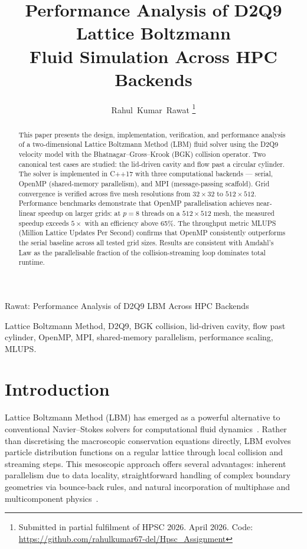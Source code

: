 \documentclass[journal]{IEEEtran}
\begin{document}
\title{Performance Analysis of D2Q9 Lattice Boltzmann\\
       Fluid Simulation Across HPC Backends}

\author{Rahul~Kumar~Rawat%
\thanks{Submitted in partial fulfilment of HPSC 2026.
        April 2026.
        Code: \url{https://github.com/rahulkumar67-del/Hpsc_Assignment}}}

%
{Rawat: Performance Analysis of D2Q9 LBM Across HPC Backends}

\maketitle

\begin{abstract}
This paper presents the design, implementation, verification, and
performance analysis of a two-dimensional Lattice Boltzmann Method
(LBM) fluid solver using the D2Q9 velocity model with the
Bhatnagar--Gross--Krook (BGK) collision operator.  Two canonical test
cases are studied: the lid-driven cavity and flow past a circular
cylinder.  The solver is implemented in C++17 with three computational
backends --- serial, OpenMP (shared-memory parallelism), and MPI
(message-passing scaffold).  Grid convergence is verified across five
mesh resolutions from $32\times32$ to $512\times512$.  Performance
benchmarks demonstrate that OpenMP parallelisation achieves
near-linear speedup on larger grids: at $p=8$ threads on a
$512\times512$ mesh, the measured speedup exceeds $5\times$ with an
efficiency above 65\%.  The throughput metric MLUPS (Million Lattice
Updates Per Second) confirms that OpenMP consistently outperforms the
serial baseline across all tested grid sizes.  Results are consistent
with Amdahl's Law as the parallelisable fraction of the collision-streaming
loop dominates total runtime.
\end{abstract}

\begin{IEEEkeywords}
Lattice Boltzmann Method, D2Q9, BGK collision, lid-driven cavity,
flow past cylinder, OpenMP, MPI, shared-memory parallelism,
performance scaling, MLUPS.
\end{IEEEkeywords}

\IEEEpeerreviewmaketitle

\section{Introduction}
 Lattice Boltzmann Method (LBM) has emerged as a
powerful alternative to conventional Navier--Stokes solvers for
computational fluid dynamics~\cite{chen1998}.  Rather than discretising
the macroscopic conservation equations directly, LBM evolves particle
distribution functions on a regular lattice through local collision
and streaming steps.  This mesoscopic approach offers several
advantages: inherent parallelism due to data locality, straightforward
handling of complex boundary geometries via bounce-back rules, and
natural incorporation of multiphase and multicomponent
physics~\cite{succi2001}.
\end{document}
